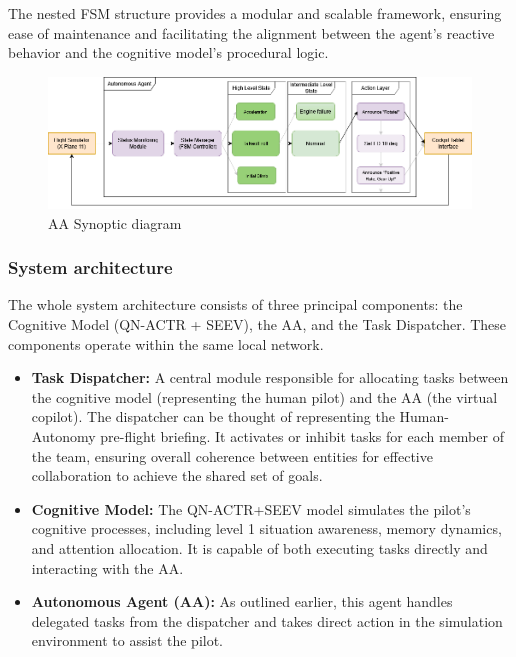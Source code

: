 \documentclass[12pt,a4paper]{article} %
\begin{document}
	The nested FSM structure provides a modular and scalable framework, ensuring ease of maintenance and facilitating the alignment between the agent's reactive behavior and the cognitive model's procedural logic.

	\begin{figure}[h!]
		\centering
		\includegraphics[width=1.0\textwidth]{./images/AA_synoptic.png}
		\caption{AA Synoptic diagram}
		\label{fig:aa_synoptic}
	\end{figure}
	
	\subsubsection{System architecture}
	The whole system architecture consists of three principal components: the Cognitive Model (QN-ACTR + SEEV), the AA, and the Task Dispatcher. These components operate within the same local network.

	\begin{itemize} \item \textbf{Task Dispatcher:} A central module responsible for allocating tasks between the cognitive model (representing the human pilot) and the AA (the virtual copilot). The dispatcher can be thought of representing the Human-Autonomy pre-flight briefing. It activates or inhibit tasks for each member of the team, ensuring overall coherence between entities for effective collaboration to achieve the shared set of goals. \item \textbf{Cognitive Model:} The QN-ACTR+SEEV model simulates the pilot's cognitive processes, including level 1 situation awareness, memory dynamics, and attention allocation. It is capable of both executing tasks directly and interacting with the AA. \item \textbf{Autonomous Agent (AA):} As outlined earlier, this agent handles delegated tasks from the dispatcher and takes direct action in the simulation environment to assist the pilot. \end{itemize}
\end{document}
